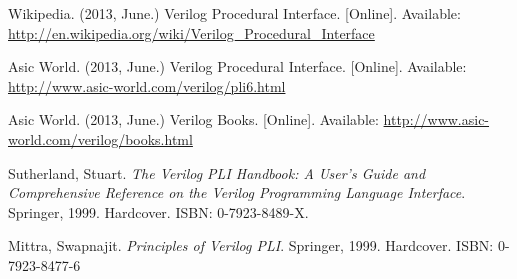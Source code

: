 \begin{thebibliography}{10}
\BIBentryALTinterwordspacing
Wikipedia. (2013, June.) {Verilog Procedural Interface}. [Online]. Available:
  \url{http://en.wikipedia.org/wiki/Verilog_Procedural_Interface}
\BIBentrySTDinterwordspacing

\BIBentryALTinterwordspacing
Asic World. (2013, June.) {Verilog Procedural Interface}. [Online]. Available:
  \url{http://www.asic-world.com/verilog/pli6.html}
\BIBentrySTDinterwordspacing

\BIBentryALTinterwordspacing
Asic World. (2013, June.) {Verilog Books}. [Online]. Available:
  \url{http://www.asic-world.com/verilog/books.html}
\BIBentrySTDinterwordspacing

\BIBentryALTinterwordspacing
Sutherland, Stuart.  {\em The Verilog PLI Handbook: A User's Guide and Comprehensive
  Reference on the Verilog Programming Language Interface}.
\newblock Springer, 1999. Hardcover.
\newblock ISBN: 0-7923-8489-X.
\BIBentrySTDinterwordspacing

\BIBentryALTinterwordspacing
Mittra, Swapnajit.  {\em Principles of Verilog PLI}.
\newblock Springer, 1999. Hardcover.
\newblock ISBN: 0-7923-8477-6
\BIBentrySTDinterwordspacing

%
%
%
%

\end{thebibliography}
